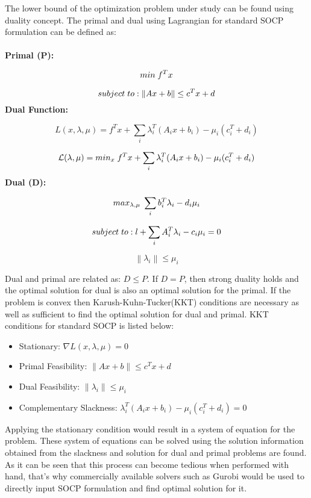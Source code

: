 The lower bound of the optimization problem under study can be found using duality concept. The primal and dual using Lagrangian for standard SOCP formulation can be defined as:\\ \\
\textbf{Primal (P):}

\[
  min \hspace{0.1cm}f^Tx
\]

\[
  subject \hspace{0.1cm}to: \lVert Ax+b \rVert \leq c^Tx+d
\]
\textbf{Dual Function:}

\[
 L(x, \lambda, \mu) = f^Tx+\sum_i \lambda_i^T(A_ix+b_i)-\mu_i(c_i^T+d_i)
\]

\[
  \mathcal{L}(\lambda, \mu) = min_x \hspace{0.1cm} f^Tx+\sum_i \lambda_i^T(A_ix+b_i)-\mu_i(c_i^T+d_i)
\]
\textbf{Dual (D):}


\[
  max_{\lambda,\mu} \hspace{0.1cm} \sum_i b_i^T\lambda_i - d_i\mu_i
\]

\[
  subject \hspace{0.1cm}to: l+\sum_iA^T_i\lambda_i - c_i\mu_i = 0
\]

\[
  \left \|  \lambda_i  \right \| \leq \mu_i 
\]

Dual and primal are related as: $D \leq P$. If $D=P$, then strong duality holds and the optimal solution for dual is also an optimal solution for the primal. If the problem is convex then Karush-Kuhn-Tucker(KKT) conditions are necessary as well as sufficient to find the optimal solution for dual and primal. KKT conditions for standard SOCP is listed below: 

\begin{itemize}
    \item Stationary: $\nabla L(x,\lambda, \mu) = 0$
    \item Primal Feasibility: $\lVert Ax+b \rVert \leq c^Tx+d$
    \item Dual Feasibility: $\left \|  \lambda_i  \right \| \leq \mu_i$ 
    \item Complementary Slackness: $\lambda_i^T(A_ix+b_i)-\mu_i(c_i^T+d_i)=0$
\end{itemize}

Applying the stationary condition would result in a system of equation for the problem. These system of equations can be solved using the solution information obtained from the slackness and solution for dual and primal problems are found. As it can be seen that this process can become tedious when performed with hand, that's why commercially available solvers such as Gurobi would be used to directly input SOCP formulation and find optimal solution for it. 